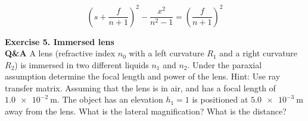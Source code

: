 \documentclass[main.tex]{subfiles}
\begin{document}
\begin{equation}\label{eq:e18}
(s + \frac{f}{n+1})^2 - \frac{x^2}{n^2-1} = (\frac{f}{n+1})^2
\end{equation}

\textbf{Exercise 5. Immersed lens}\\
\textbf{Q\&A} A lens (refractive index $n_0$ with a left curvature $R_1$ and a right curvature $R_2$) is immersed in two different liquids $n_1$ and $n_2$. Under the paraxial assumption determine the focal length and power of the lens. Hint: Use ray transfer matrix. Assuming that the lens is in air, and has a focal length of $\SI{1.0e-2}{\meter}$. The object has an elevation $h_1=1$ is positioned at $\SI{5.0e-3}{\meter}$ away from the lens. What is the lateral magnification? What is the distance?





\end{document}
